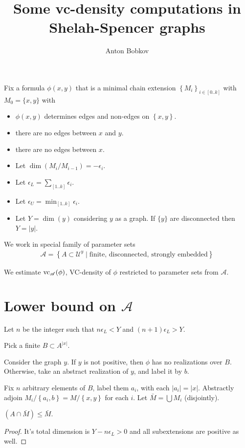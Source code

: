 \documentclass{amsart}
\title{Some vc-density computations in Shelah-Spencer graphs}
\author{Anton Bobkov}
\renewcommand{\AA}{\mathscr A}
\newcommand{\U}{\mathcal U}
\newcommand{\curly}[1]{\left\{#1\right\}}
\newcommand{\paren}[1]{\left(#1\right)}
\begin{document}
\maketitle

Fix a formula $\phi(x, y)$ that is a minimal chain extension $\curly{M_i}_{i \in [0..k]}$ with $M_0 = \{x, y\}$ with
\begin{itemize}
	\item $\phi(x, y)$ determines edges and non-edges on $\curly{x, y}$.
	\item there are no edges between $x$ and $y$.
	\item there are no edges between $x$.
	\item Let $\dim \paren{M_i/M_{i-1}} = -\epsilon_i$.
	\item Let $\epsilon_L = \sum_{[1..k]} \epsilon_i$.
	\item Let $\epsilon_U = \min_{[1..k]} \epsilon_i$.
	\item Let $Y = \dim (y)$ considering $y$ as a graph. If $\{y\}$ are disconnected then $Y = |y|$.
\end{itemize}

We work in special family of parameter sets
\begin{align*}
	\AA = \curly{A \subset \U^{y} \mid \text{finite, disconnected, strongly embedded}}
\end{align*}

We estimate $\vc_\AA(\phi)$, VC-density of $\phi$ restricted to parameter sets from $\AA$.

\section*{Lower bound on $\AA$}

Let $n$ be the integer such that $n \epsilon_L < Y$ and $(n+1) \epsilon_L > Y$.

Pick a finite $B \subset A^{|x|}$.

Consider the graph $y$.
If $y$ is not positive, then $\phi$ has no realizations over $B$.
Otherwise, take an abstract realization of $y$, and label it by $b$.

Fix $n$ arbitrary elements of $B$, label them $a_i$, with each $|a_i| = |x|$.
Abstractly adjoin $M_i/\curly{a_i, b} = M/\curly{x,y}$ for each $i$.
Let $\bar M = \bigcup M_i$ (disjointly).

\begin{Claim}
	$(A \cap \bar M) \leq \bar M$.
\end{Claim}
\begin{proof}
	It's total dimension is $Y - n\epsilon_L > 0$ and all subextensions are positive as well.
\end{proof}
\end{document}
